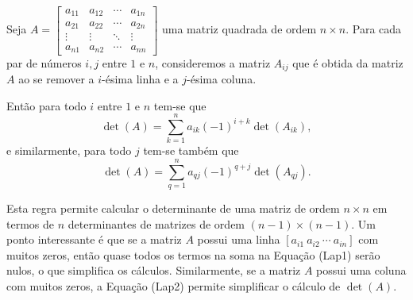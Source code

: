 \begin{theorem}
	Seja $A=\begin{bmatrix}a_{11}&a_{12}&\cdots&a_{1n}\\
	a_{21}&a_{22}&\cdots&a_{2n}\\
	\vdots&\vdots&\ddots&\vdots\\
	a_{n1}&a_{n2}&\cdots&a_{nn}\end{bmatrix}$ uma matriz quadrada de ordem $n\times n$. Para cada par de números $i,j$ entre $1$ e $n$, consideremos a matriz $A_{ij}$ que é obtida da matriz $A$ ao se remover a $i$-ésima linha e a $j$-ésima coluna.
	
	Então para todo $i$ entre $1$ e $n$ tem-se que	
	\[\det(A)=\sum_{k=1}^na_{ik}(-1)^{i+k}\det(A_{ik}),\tag{Lap1}\]
	e similarmente, para todo $j$ tem-se também que
	\[\det(A)=\sum_{q=1}^n a_{qj}(-1)^{q+j}\det(A_{qj}).\tag{Lap2}\]
\end{theorem}

Esta regra permite calcular o determinante de uma matriz de ordem $n\times n$ em termos de $n$ determinantes de matrizes de ordem $(n-1)\times (n-1)$. Um ponto interessante é que se a matriz $A$ possui uma linha $[a_{i1}\ a_{i2}\ \cdots\ a_{in}]$ com muitos zeros, então quase todos os termos na soma na Equação (Lap1) serão nulos, o que simplifica os cálculos. Similarmente, se a matriz $A$ possui uma coluna com muitos zeros, a Equação (Lap2) permite simplificar o cálculo de $\det(A)$.

